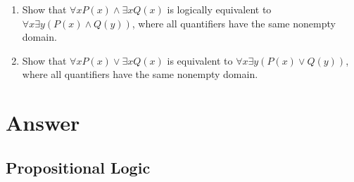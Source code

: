 \documentclass{sig-alternate-05-2015}
\begin{document}
\begin{enumerate}
\item Show that $\forall x P(x) \wedge \exists x Q(x)$ is logically equivalent
to $\forall x \exists y (P(x) \wedge Q(y))$, where all quantifiers have
the same nonempty domain.

\item Show that $\forall xP(x) \vee \exists x Q(x)$ is equivalent to $\forall x \exists y
(P(x) \vee Q(y))$, where all quantifiers have the same
nonempty domain.
\end{enumerate}

\newpage
\appendix
\section{Answer}
\subsection{Propositional Logic}
\end{document}
